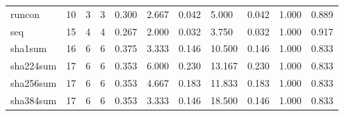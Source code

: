 \begin{longtable}{lp{1.2cm}p{1.2cm}p{1.2cm}p{1.2cm}p{1.2cm}p{1.2cm}p{1.2cm}p{1.2cm}p{1.2cm}p{1.2cm}}
runcon    &                           10 &                  3 &                                 3 &                                      0.300 &                                  2.667 &                                        0.042 &                             5.000 &                                   0.042 &                              1.000 &                                              0.889 \\
seq       &                           15 &                  4 &                                 4 &                                      0.267 &                                  2.000 &                                        0.032 &                             3.750 &                                   0.032 &                              1.000 &                                              0.917 \\
sha1sum   &                           16 &                  6 &                                 6 &                                      0.375 &                                  3.333 &                                        0.146 &                            10.500 &                                   0.146 &                              1.000 &                                              0.833 \\
sha224sum &                           17 &                  6 &                                 6 &                                      0.353 &                                  6.000 &                                        0.230 &                            13.167 &                                   0.230 &                              1.000 &                                              0.833 \\
sha256sum &                           17 &                  6 &                                 6 &                                      0.353 &                                  4.667 &                                        0.183 &                            11.833 &                                   0.183 &                              1.000 &                                              0.833 \\
sha384sum &                           17 &                  6 &                                 6 &                                      0.353 &                                  3.333 &                                        0.146 &                            18.500 &                                   0.146 &                              1.000 &                                              0.833 \\

\end{longtable}
